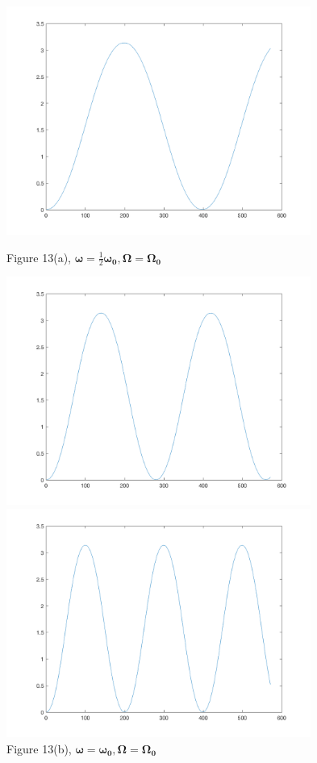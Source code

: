 \documentclass[12pt]{article}
\renewcommand{\(}{\left (}
\renewcommand{\)}{\right )}
\renewcommand{\vec}[1]{\boldsymbol{#1}}
\begin{document}
\begin{figure}[h]
	\begin{minipage}{0.33\textwidth}
		\centering
		\includegraphics[width=0.89\textwidth]{L5000.png}
		\caption*{\small Figure 13(a), $\vec{\omega} = \frac{1}{2}\vec{\omega_0}, \vec{\Omega} = \vec{\Omega_0}$}
	\end{minipage}
	\begin{minipage}{0.33\textwidth}
		\centering
		\includegraphics[width=0.89\textwidth]{L10000.png}
		\caption*{\small Figure 13(b), $\vec{\omega} = \vec{\omega_0}, \vec{\Omega} = \vec{\Omega_0}$}
	\end{minipage}
	\begin{minipage}{0.33\textwidth}
		\centering
		\includegraphics[width=0.89\textwidth]{L20000.png}

\end{minipage}
\end{figure}
\end{document}
